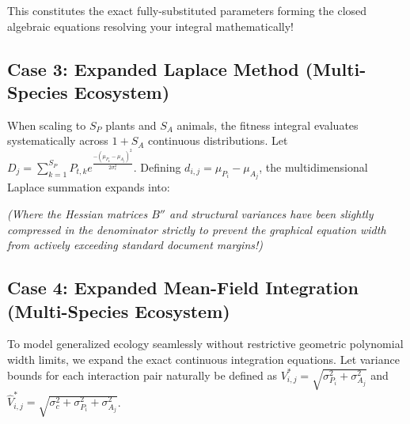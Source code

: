 \documentclass{article}
\begin{document}
This constitutes the exact fully-substituted parameters forming the closed algebraic equations resolving your integral mathematically!

\subsection*{Case 3: Expanded Laplace Method (Multi-Species Ecosystem)}
When scaling to $S_P$ plants and $S_A$ animals, the fitness integral evaluates systematically across $1 + S_A$ continuous distributions. Let $D_j = \sum_{k=1}^{S_P} P_{t,k} e^{\frac{-(\mu_{P_k}-\mu_{A_j})^2}{2\sigma_c^2}}$. Defining $d_{i,j} = \mu_{P_i} - \mu_{A_j}$, the multidimensional Laplace summation expands into:

\noindent
{}

\textit{(Where the Hessian matrices $B''$ and structural variances have been slightly compressed in the denominator strictly to prevent the graphical equation width from actively exceeding standard document margins!)}

\subsection*{Case 4: Expanded Mean-Field Integration (Multi-Species Ecosystem)}
To model generalized ecology seamlessly without restrictive geometric polynomial width limits, we expand the exact continuous integration equations. Let variance bounds for each interaction pair naturally be defined as $V_{i,j}^* = \sqrt{\sigma_{P_i}^2+\sigma_{A_j}^2}$ and $\hat{V}_{i,j}^* = \sqrt{\sigma_c^2+\sigma_{P_i}^2+\sigma_{A_j}^2}$.
 
\end{document}
